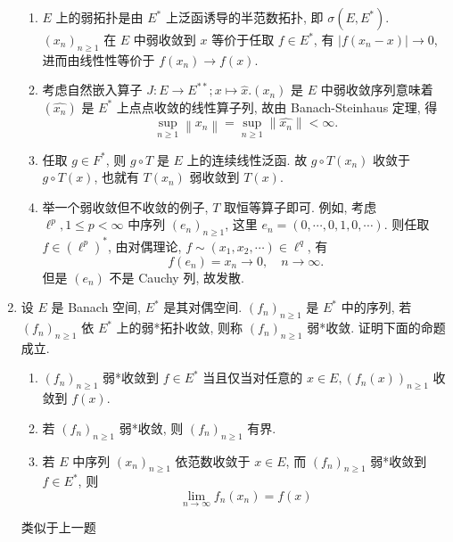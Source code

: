 \begin{enumerate}
\begin{enumerate}
      \end{enumerate}
      \begin{answer}
        \begin{enumerate}
          \item $E$ 上的弱拓扑是由 $E^{*}$ 上泛函诱导的半范数拓扑, 即 $\sigma\left(E, E^{*}\right)$.
          $\left(x_{n}\right)_{n \geq 1}$ 在 $E$ 中弱收敛到 $x$ 等价于任取 $f \in E^{*}$, 有 $\left|f\left(x_{n}-x\right)\right| \rightarrow 0$, 进而由线性性等价于 $f\left(x_{n}\right) \rightarrow f(x)$.
          \item 考虑自然嵌入算子 $J: E \rightarrow E^{* *} ; x \mapsto \hat{x} .\left(x_{n}\right)$ 是 $E$ 中弱收敛序列意味着 $\left(\widehat{x_{n}}\right)$ 是 $E^{*}$ 上点点收敛的线性算子列, 故由 Banach-Steinhaus 定理, 得
          \[
          \sup _{n \geq 1}\left\|x_{n}\right\|=\sup _{n \geq 1}\left\|\widehat{x_{n}}\right\|<\infty .
          \]
          \item 任取 $g \in F^{*}$, 则 $g \circ T$ 是 $E$ 上的连续线性泛函. 故 $g \circ T\left(x_{n}\right)$ 收敛于 $g \circ T(x)$, 也就有 $T\left(x_{n}\right)$ 弱收敛到 $T(x)$.
          \item 举一个弱收敛但不收敛的例子, $T$ 取恒等算子即可. 例如, 考虑 $\ell^{p}, 1 \leq p<\infty$ 中序列 $\left(e_{n}\right)_{n \geq 1}$, 这里 $e_{n}=(0, \cdots, 0,1,0, \cdots)$. 则任取 $f \in\left(\ell^{p}\right)^{*}$, 由对偶理论, $f \sim\left(x_{1}, x_{2}, \cdots\right) \in \ell^{q}$, 有
          \[
          f\left(e_{n}\right)=x_{n} \rightarrow 0, \quad n \rightarrow \infty .
          \]
          但是 $\left(e_{n}\right)$ 不是 Cauchy 列, 故发散. \qedhere
        \end{enumerate}
      \end{answer}
    \item 设 $E$ 是 Banach 空间, $E^{*}$ 是其对偶空间. $\left(f_{n}\right)_{n \geq 1}$ 是 $E^{*}$ 中的序列, 若 $\left(f_{n}\right)_{n \geq 1}$ 依 $E^{*}$ 上的弱*拓扑收敛, 则称 $\left(f_{n}\right)_{n \geq 1}$ 弱*收敛. 证明下面的命题成立.
      \begin{enumerate}
        \item $\left(f_{n}\right)_{n \geq 1}$ 弱*收敛到 $f \in E^{*}$ 当且仅当对任意的 $x \in E,\left(f_{n}(x)\right)_{n \geq 1}$ 收敛到 $f(x)$.
        \item 若 $\left(f_{n}\right)_{n \geq 1}$ 弱*收敛, 则 $\left(f_{n}\right)_{n \geq 1}$ 有界.
        \item 若 $E$ 中序列 $\left(x_{n}\right)_{n \geq 1}$ 依范数收敛于 $x \in E$, 而 $\left(f_{n}\right)_{n \geq 1}$ 弱*收敛到 $f \in E^{*}$, 则
        \[
            \lim _{n \rightarrow \infty} f_{n}\left(x_{n}\right)=f(x)
        \]
      \end{enumerate}
      \begin{answer}
        类似于上一题
      \end{answer}
\end{enumerate}


